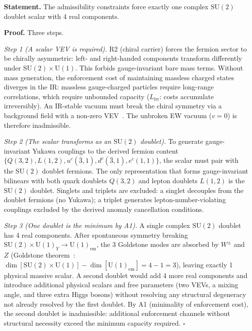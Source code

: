\documentclass[11pt]{article}
\newcommand{\SU}{\mathrm{SU}}
\newcommand{\U}{\mathrm{U}}
\begin{document}
\begin{tcolorbox}[apfbox, title={Theorem $T_{\mathrm{Higgs}}$ (Scalar Sector)}]
\textbf{Statement.}  The admissibility constraints force exactly one complex $\SU(2)$ doublet scalar with 4 real components.

\smallskip\noindent\textbf{Proof.}  Three steps.

\textit{Step 1 (A scalar VEV is required).}  R2 (chiral carrier) forces the fermion sector to be chirally asymmetric: left- and right-handed components transform differently under $\SU(2) \times \U(1)$.  This forbids gauge-invariant bare mass terms.  Without mass generation, the enforcement cost of maintaining massless charged states diverges in the IR: massless gauge-charged particles require long-range correlations, which require unbounded capacity ($L_{\mathrm{irr}}$: costs accumulate irreversibly).  An IR-stable vacuum must break the chiral symmetry via a background field with a non-zero VEV~\cite{Englert1964,Higgs1964}.  The unbroken EW vacuum ($v = 0$) is therefore inadmissible.

\textit{Step 2 (The scalar transforms as an $\SU(2)$ doublet).}  To generate gauge-invariant Yukawa couplings to the derived fermion content $\{Q(3,2), L(1,2), u^c(\bar{3},1), d^c(\bar{3},1), e^c(1,1)\}$, the scalar must pair with the $\SU(2)$ doublet fermions.  The only representation that forms gauge-invariant bilinears with both quark doublets $Q(3,2)$ and lepton doublets $L(1,2)$ is the $\SU(2)$ doublet.  Singlets and triplets are excluded: a singlet decouples from the doublet fermions (no Yukawa); a triplet generates lepton-number-violating couplings excluded by the derived anomaly cancellation conditions.

\textit{Step 3 (One doublet is the minimum by A1).}  A single complex $\SU(2)$ doublet has 4 real components.  After spontaneous symmetry breaking $\SU(2) \times \U(1)_Y \to \U(1)_{\mathrm{em}}$, the 3 Goldstone modes are absorbed by $W^\pm$ and $Z$ (Goldstone theorem~\cite{Goldstone1962}: $\dim[\SU(2) \times \U(1)] - \dim[\U(1)_{\mathrm{em}}] = 4 - 1 = 3$), leaving exactly 1 physical massive scalar.  A second doublet would add 4 more real components and introduce additional physical scalars and free parameters (two VEVs, a mixing angle, and three extra Higgs bosons) without resolving any structural degeneracy not already resolved by the first doublet.  By A1 (minimality of enforcement cost), the second doublet is inadmissible: additional enforcement channels without structural necessity exceed the minimum capacity required.  $\square$
\end{tcolorbox}
\end{document}
